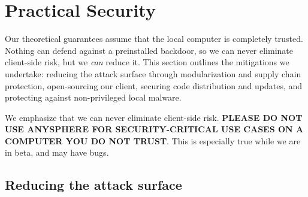 \section{Practical Security} \label{sec:practical-security}

Our theoretical guarantees assume that the local computer is completely trusted. Nothing can defend against a preinstalled backdoor, so we can never eliminate client-side risk, but we \textit{can} reduce it. This section outlines the mitigations we undertake: reducing the attack surface through modularization and supply chain protection, open-sourcing our client, securing code distribution and updates, and protecting against non-privileged local malware.


We emphasize that we can never eliminate client-side risk. \textbf{PLEASE DO NOT USE ANYSPHERE FOR SECURITY-CRITICAL USE CASES ON A COMPUTER YOU DO NOT TRUST}. This is especially true while we are in beta, and may have bugs.




\subsection{Reducing the attack surface}

